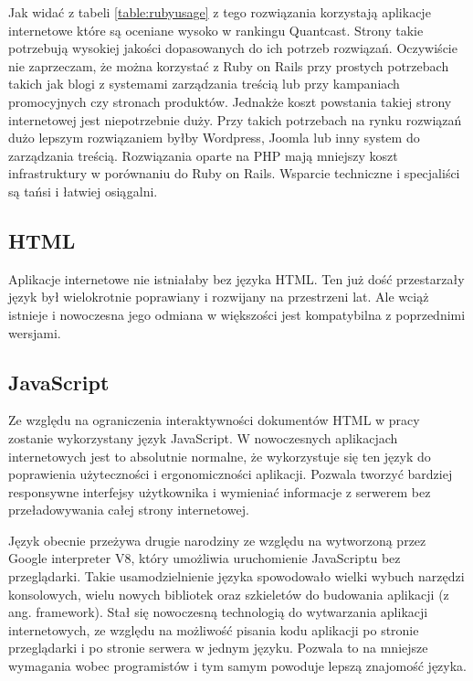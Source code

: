 Jak widać z tabeli \ref{table:rubyusage} z tego rozwiązania korzystają aplikacje internetowe które są oceniane wysoko w rankingu Quantcast. Strony takie potrzebują wysokiej jakości dopasowanych do ich potrzeb rozwiązań. Oczywiście nie zaprzeczam, że można korzystać z Ruby on Rails przy prostych potrzebach takich jak blogi z systemami zarządzania treścią lub przy kampaniach promocyjnych czy stronach produktów. Jednakże koszt powstania takiej strony internetowej jest niepotrzebnie duży. Przy takich potrzebach na rynku rozwiązań dużo lepszym rozwiązaniem byłby Wordpress, Joomla lub inny system do zarządzania treścią. Rozwiązania oparte na PHP mają mniejszy koszt infrastruktury w porównaniu do Ruby on Rails. Wsparcie techniczne i specjaliści są tańsi i łatwiej osiągalni.

\subsection{HTML}
Aplikacje internetowe nie istniałaby bez języka HTML. Ten już dość przestarzały język był wielokrotnie poprawiany i rozwijany na przestrzeni lat. Ale wciąż istnieje i nowoczesna jego odmiana w większości jest kompatybilna z poprzednimi wersjami.

\subsection{JavaScript}
Ze względu na ograniczenia interaktywności dokumentów HTML w pracy zostanie wykorzystany język JavaScript. W nowoczesnych aplikacjach internetowych jest to absolutnie normalne, że wykorzystuje się ten język do poprawienia użyteczności i ergonomiczności aplikacji. Pozwala tworzyć bardziej responsywne interfejsy użytkownika i wymieniać informacje z serwerem bez przeładowywania całej strony internetowej.

Język obecnie przeżywa drugie narodziny ze względu na wytworzoną przez Google interpreter V8, który umożliwia uruchomienie JavaScriptu bez przeglądarki. Takie usamodzielnienie języka spowodowało wielki wybuch narzędzi konsolowych, wielu nowych bibliotek oraz szkieletów do budowania aplikacji (z ang. framework). Stał się nowoczesną technologią do wytwarzania aplikacji internetowych, ze względu na możliwość pisania kodu aplikacji po stronie przeglądarki i po stronie serwera w jednym języku. Pozwala to na mniejsze wymagania wobec programistów i tym samym powoduje lepszą znajomość języka.


